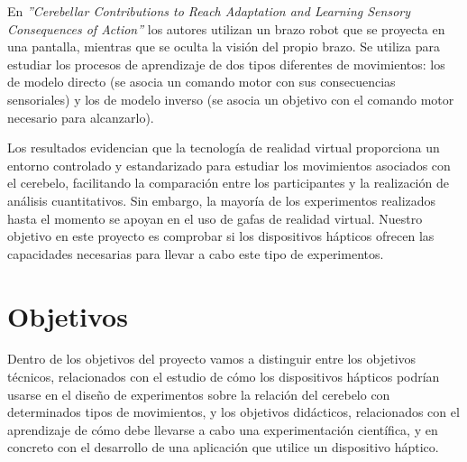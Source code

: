 \documentclass[a4paper,11pt, oneside]{book}
\begin{document}
En \textit{''Cerebellar Contributions to Reach Adaptation and Learning Sensory Consequences of Action''}\cite{cerebellar} los autores utilizan un brazo robot que se proyecta en una pantalla, mientras que se oculta la visión del propio brazo. Se utiliza para estudiar los procesos de aprendizaje de dos tipos diferentes de movimientos: los de modelo directo (se asocia un comando motor con sus consecuencias sensoriales) y los de modelo inverso (se asocia un objetivo con el comando motor necesario para alcanzarlo).


Los resultados evidencian que la tecnología de realidad virtual proporciona un entorno controlado y estandarizado para estudiar los movimientos asociados con el cerebelo, facilitando la comparación entre los participantes y la realización de análisis cuantitativos. Sin embargo, la mayoría de los experimentos realizados hasta el momento se apoyan en el uso de gafas de realidad virtual. Nuestro objetivo en este proyecto es comprobar si los dispositivos hápticos ofrecen las capacidades necesarias para llevar a cabo este tipo de experimentos.

\section{Objetivos}

Dentro de los objetivos del proyecto vamos a distinguir entre los objetivos técnicos, relacionados con el estudio de cómo los dispositivos hápticos podrían usarse en el diseño de experimentos sobre la relación del cerebelo con determinados tipos de movimientos, y los objetivos didácticos, relacionados con el aprendizaje de cómo debe llevarse a cabo una experimentación científica, y en concreto con el desarrollo de una aplicación que utilice un dispositivo háptico.
\end{document}
